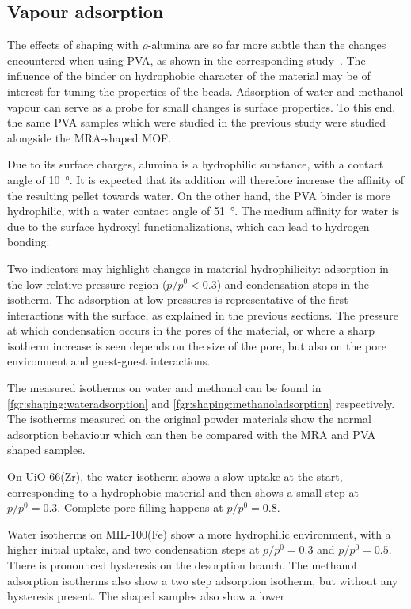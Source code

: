
\subsection{Vapour adsorption}

The effects of shaping with \(\rho\)-alumina are 
so far more subtle than the changes encountered when using 
PVA, as shown in the corresponding 
study~\cite{chanutObservingEffectsShaping2016}.
The influence of the binder on hydrophobic character of the
material may be of interest for tuning the properties of the 
beads. Adsorption of water and methanol vapour can serve as 
a probe for small changes is surface properties.
To this end, the same PVA samples which were 
studied in the previous study were studied alongside 
the MRA-shaped MOF.

Due to its surface charges, alumina is a 
hydrophilic substance, with a contact 
angle of \SI{10}{\degree}. It is expected that its 
addition will therefore increase the affinity 
of the resulting pellet towards water. On the other hand,
the PVA binder is more hydrophilic, with a water contact
angle of \SI{51}{\degree}. The medium affinity for water
is due to the surface hydroxyl functionalizations, which
can lead to hydrogen bonding.

Two indicators may highlight 
changes in material hydrophilicity: adsorption in the 
low relative pressure region (\(p/p^0 < 0.3\)) and 
condensation steps in the isotherm. The adsorption at low
pressures is representative of the first interactions with the 
surface, as explained in the previous sections. The pressure 
at which condensation occurs in the pores of the material, or 
where a sharp isotherm increase is seen depends on the 
size of the pore, but also on the pore environment and 
guest-guest interactions.

The measured isotherms on water and methanol can be found
in \autoref{fgr:shaping:wateradsorption} 
and \autoref{fgr:shaping:methanoladsorption} respectively.
The isotherms measured on the original powder materials 
show the normal adsorption behaviour which can then be 
compared with the MRA and PVA shaped samples. 

On UiO-66(Zr), the water isotherm shows a slow uptake at the 
start, corresponding to a hydrophobic material and then shows 
a small step at \(p/p^0 = 0.3\). Complete pore filling happens 
at \(p/p^0 = 0.8\).

Water isotherms on MIL-100(Fe) show a more hydrophilic environment,
with a higher initial uptake, and two condensation steps at 
\(p/p^0 = 0.3\) and \(p/p^0 = 0.5\). There is pronounced 
hysteresis on the desorption branch.
The methanol adsorption isotherms also show a two step adsorption
isotherm, but without any hysteresis present. The shaped samples 
also show a lower 

